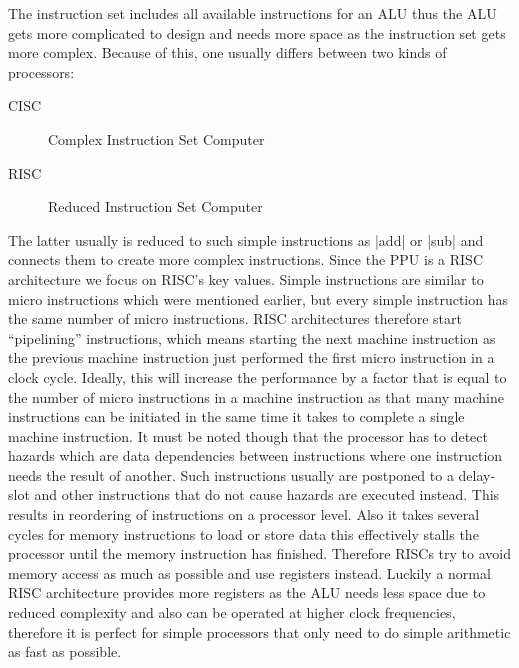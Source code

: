 The instruction set includes all available instructions for an ALU thus the ALU gets more complicated to design and needs more space as the instruction set gets more complex.
Because of this, one usually differs between two kinds of processors:
\begin{description}
    \item[CISC] Complex Instruction Set Computer
    \item[RISC] Reduced Instruction Set Computer
\end{description}
The latter usually is reduced to such simple instructions as |add| or |sub| and connects them to create more complex instructions.
Since the PPU is a RISC architecture we focus on RISC's key values.
Simple instructions are similar to micro instructions which were mentioned earlier, but every simple instruction has the same number of micro instructions.
RISC architectures therefore start ``pipelining'' instructions, which means starting the next machine instruction as the previous machine instruction just performed the first micro instruction in a clock cycle.
Ideally, this will increase the performance by a factor that is equal to the number of micro instructions in a machine instruction as that many machine instructions can be initiated in the same time it takes to complete a single machine instruction.
It must be noted though that the processor has to detect hazards which are data dependencies between instructions where one instruction needs the result of another.
Such instructions usually are postponed to a delay-slot and other instructions that do not cause hazards are executed instead.
This results in reordering of instructions on a processor level.
Also it takes several cycles for memory instructions to load or store data this effectively stalls the processor until the memory instruction has finished.
Therefore RISCs try to avoid memory access as much as possible and use registers instead.
Luckily a normal RISC architecture provides more registers as the ALU needs less space due to reduced complexity and also can be operated at higher clock frequencies, therefore it is perfect for simple processors that only need to do simple arithmetic as fast as possible.

